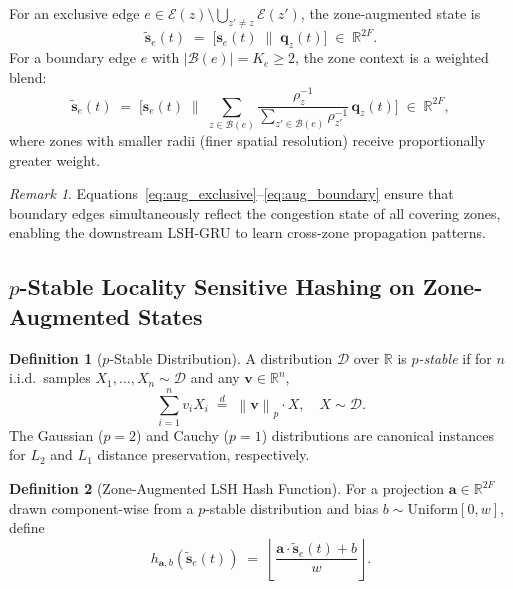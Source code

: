 \documentclass[journal,letterpaper,10pt]{IEEEtran}
\theoremstyle{definition}
\newtheorem{definition}{Definition}
\theoremstyle{remark}
\newtheorem{remark}{Remark}
\newcommand{\norm}[2]{\left\|#1\right\|_{#2}}
\newcommand{\R}{\mathbb{R}}
\newcommand{\floor}[1]{\left\lfloor #1 \right\rfloor}
\newcommand{\zstate}{\mathbf{q}}
\begin{document}
For an exclusive edge $e\in\mathcal{E}(z)\setminus\bigcup_{z'\neq
z}\mathcal{E}(z')$, the zone-augmented state is
\begin{equation}
  \tilde{\mathbf{s}}_{e}(t)
  \;=\;
  \bigl[\mathbf{s}_{e}(t)\;\|\;\zstate_z(t)\bigr]
  \;\in\;\R^{2F}.
  \label{eq:aug_exclusive}
\end{equation}
For a boundary edge $e$ with $|\mathcal{B}(e)|=K_e\geq2$, the zone
context is a weighted blend:
\begin{equation}
  \tilde{\mathbf{s}}_{e}(t)
  \;=\;
  \Biggl[\mathbf{s}_{e}(t)
  \;\Bigg\|\;
  \sum_{z\in\mathcal{B}(e)}
    \frac{\rho_z^{-1}}{\sum_{z'\in\mathcal{B}(e)}\rho_{z'}^{-1}}\,
    \zstate_z(t)
  \Biggr]
  \;\in\;\R^{2F},
  \label{eq:aug_boundary}
\end{equation}
where zones with smaller radii (finer spatial resolution) receive
proportionally greater weight.

\begin{remark}
Equations~\eqref{eq:aug_exclusive}--\eqref{eq:aug_boundary} ensure
that boundary edges simultaneously reflect the congestion state of
all covering zones, enabling the downstream LSH-GRU to learn
cross-zone propagation patterns.
\end{remark}

\subsection{\texorpdfstring{$p$-Stable Locality Sensitive Hashing
on Zone-Augmented States}%
{p-Stable LSH on Zone-Augmented States}}
\label{sec:lsh}

\begin{definition}[$p$-Stable Distribution]
\label{def:pstable}
A distribution $\mathcal{D}$ over $\R$ is \emph{$p$-stable} if for
$n$ i.i.d.\ samples $X_1,\ldots,X_n\!\sim\!\mathcal{D}$ and any
$\mathbf{v}\in\R^n$,
\[
  \textstyle\sum_{i=1}^{n}v_i X_i
  \;\overset{d}{=}\;
  \norm{\mathbf{v}}{p}\cdot X,\quad X\sim\mathcal{D}.
\]
The Gaussian ($p=2$) and Cauchy ($p=1$) distributions are canonical
instances for $L_2$ and $L_1$ distance preservation, respectively.
\end{definition}

\begin{definition}[Zone-Augmented LSH Hash Function]
\label{def:lsh}
For a projection $\mathbf{a}\in\R^{2F}$ drawn component-wise from a
$p$-stable distribution and bias $b\sim\mathrm{Uniform}[0,w]$, define
\begin{equation}
  h_{\mathbf{a},b}\!\left(\tilde{\mathbf{s}}_{e}(t)\right)
  \;=\;
  \floor{
    \dfrac{\mathbf{a}\cdot\tilde{\mathbf{s}}_{e}(t)+b}{w}
  }.
  \label{eq:lsh_hash}
\end{equation}
\end{definition}
\end{document}
